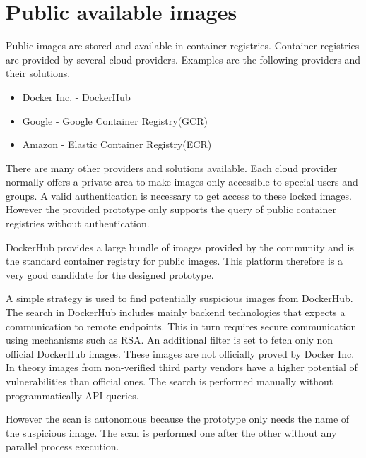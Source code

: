 \section{Public available images}
\label{ch:eval:public_images}
Public images are stored and available in container registries. 
Container registries are provided by several cloud providers.
Examples are the following providers and their solutions.
\begin{itemize}
    \item Docker Inc. - DockerHub
    \item Google - Google Container Registry(GCR)
    \item Amazon - Elastic Container Registry(ECR)
\end{itemize}{}    
There are many other providers and solutions available. 
Each cloud provider normally offers a private area to make images only accessible to special users and groups. 
A valid authentication is necessary to get access to these locked images.
However the provided prototype only supports the query of public container registries without authentication.

DockerHub provides a large bundle of images provided by the community and is the standard container registry for public images.
This platform therefore is a very good candidate for the designed prototype.

A simple strategy is used to find potentially suspicious images from DockerHub.
The search in DockerHub includes mainly backend technologies that expects a communication to remote endpoints.
This in turn requires secure communication using mechanisms such as RSA.
An additional filter is set to fetch only non official DockerHub images.
These images are not officially proved by Docker Inc.
In theory images from non-verified third party vendors have a higher potential of vulnerabilities than official ones.
The search is performed manually without programmatically API queries. 

However the scan is autonomous because the prototype only needs the name of the suspicious image.
The scan is performed one after the other without any parallel process execution.

